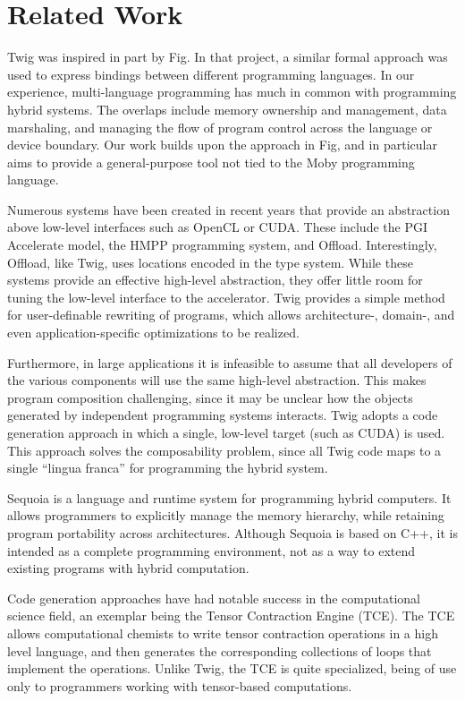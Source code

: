 
\section{Related Work}

Twig was inspired in part by Fig\cite{fig}. In that project, a similar formal approach was used to express bindings between different programming languages. In our experience, multi-language programming has much in common with programming hybrid systems. The overlaps include memory ownership and management, data marshaling, and managing the flow of program control across the language or device boundary. Our work builds upon the approach in Fig, and in particular aims to provide a general-purpose tool not tied to the Moby\cite{moby} programming language.

Numerous systems have been created in recent years that provide an abstraction above low-level interfaces such as OpenCL or CUDA. These include the PGI Accelerate model\cite{pgi-accelerate}, the HMPP programming system\cite{hmpp}, and Offload\cite{offload}. Interestingly, Offload, like Twig, uses locations encoded in the type system. While these systems provide an effective high-level abstraction, they offer little room for tuning the low-level interface to the accelerator. Twig provides a simple method for user-definable rewriting of programs, which allows architecture-, domain-, and even application-specific optimizations to be realized.

Furthermore, in large applications it is infeasible to assume that all developers of the various components will use the same high-level abstraction. This makes program composition challenging, since it may be unclear how the objects generated by independent programming systems interacts. Twig adopts a code generation approach in which a single, low-level target (such as CUDA) is used. This approach solves the composability problem, since all Twig code maps to a single ``lingua franca'' for programming the hybrid system.

Sequoia\cite{sequoia} is a language and runtime system for programming hybrid computers. It allows programmers to explicitly manage the memory hierarchy, while retaining program portability across architectures. Although Sequoia is based on C++, it is intended as a complete programming environment, not as a way to extend existing programs with hybrid computation.

Code generation approaches have had notable success in the computational science field, an exemplar being the Tensor Contraction Engine (TCE)\cite{baumgartner05synthesis}. The TCE allows computational chemists to write tensor contraction operations in a high level language, and then generates the corresponding collections of loops that implement the operations. Unlike Twig, the TCE is quite specialized, being of use only to programmers working with tensor-based computations.
